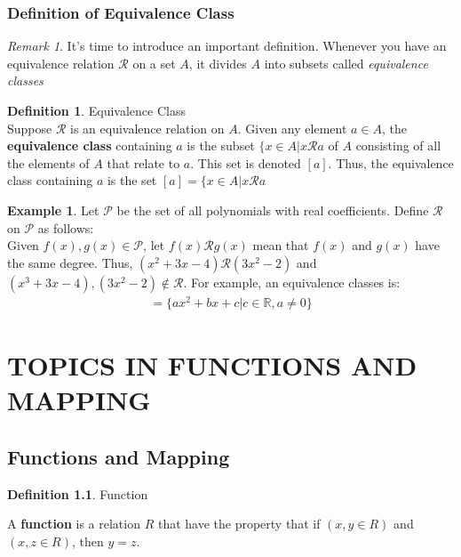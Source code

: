 \documentclass{book}
\theoremstyle{definition}
\newtheorem{definition}{Definition}[section]
\newtheorem{example}{Example}[definition]
\theoremstyle{remark}
\newtheorem{remark}{Remark}
\newcommand{\bb}[1]{\mathbb{#1}}
\newcommand{\cc}[1]{\mathcal{#1}}
\begin{document}
\newpage
\subsection{Definition of Equivalence Class}

    \begin{remark}
        It's time to introduce an important definition. Whenever you have an equivalence relation $\cc{R}$ on a set $A$, it divides $A$ into subsets called \textit{equivalence classes}
    \end{remark}
    
    \begin{tcolorbox}
        \begin{definition}
            Equivalence Class \\
            
            Suppose $\cc{R}$ is an equivalence relation on $A$. Given any element $a \in A$, the \textbf{equivalence class} containing $a$ is the subset $\{ x \in A | x \cc{R} a$ of $A$ consisting of all the elements of $A$ that relate to $a$. This set is denoted $[a]$. Thus, the equivalence class containing $a$ is the set $[a] = \{ x \in A | x \cc{R} a$
        \end{definition}
    \end{tcolorbox}
    
    \begin{example}
        Let $\cc{P}$ be the set of all polynomials with real coefficients. Define $\cc{R}$ on $\cc{P}$ as follows: \\
        
        Given $f(x), g(x) \in \cc{P}$, let $f(x) \cc{R} g(x)$ mean that $f(x)$ and $g(x)$ have the same degree. Thus, $(x^2 + 3x - 4) \cc{R} (3x^2 - 2)$ and $(x^3 + 3x - 4), (3x^2 - 2) \notin \cc{R}$. For example, an equivalence classes is: 
            \begin{align*}
                [x^3 + 3x - 4] = \{ ax^2 + bx + c | c \in \bb{R}, a \neq 0 \}
            \end{align*}
        
    \end{example}










\newpage
\chapter{TOPICS IN FUNCTIONS AND MAPPING}
\section{Functions and Mapping}
    
    \begin{definition}
    Function \\
    
        \begin{tcolorbox}
            A \textbf{function} is a relation $R$ that have the property that if $(x,y \in R)$ and $(x,z \in R )$, then $y=z$. 
        \end{tcolorbox}
    \end{definition}
\end{document}

